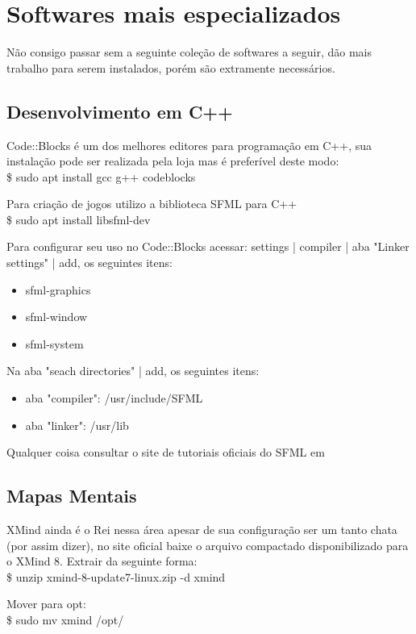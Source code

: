 \documentclass[a4paper,11pt]{article}
\begin{document}
\section{Softwares mais especializados}
Não consigo passar sem a seguinte coleção de softwares a seguir, dão mais trabalho para serem instalados, porém são extramente necessários.

\subsection{Desenvolvimento em C++}
Code::Blocks é um dos melhores editores para programação em C++, sua instalação pode ser realizada pela loja mas é preferível deste modo: \\
{\ttfamily\$ sudo apt install gcc g++ codeblocks}

Para criação de jogos utilizo a biblioteca SFML para C++ \\
{\ttfamily\$ sudo apt install libsfml-dev}

Para configurar seu uso no Code::Blocks acessar: settings | compiler | aba "Linker settings" | add, os seguintes itens:
\begin{itemize}[noitemsep]
  \item sfml-graphics
  \item sfml-window
  \item sfml-system
\end{itemize}

Na aba "seach directories" | add, os seguintes itens:
\begin{itemize}[noitemsep]
  \item aba "compiler": /usr/include/SFML
  \item aba "linker": /usr/lib
\end{itemize}

Qualquer coisa consultar o site de tutoriais oficiais do SFML em \cite{sfml}

\subsection{Mapas Mentais}
XMind ainda é o Rei nessa área apesar de sua configuração ser um tanto chata (por assim dizer), no site oficial \cite{xmind} baixe o arquivo compactado disponibilizado para o XMind 8. Extrair da seguinte forma: \\
{\ttfamily\$ unzip xmind-8-update7-linux.zip -d xmind}

Mover para opt: \\
{\ttfamily\$ sudo mv xmind /opt/}
\end{document}
